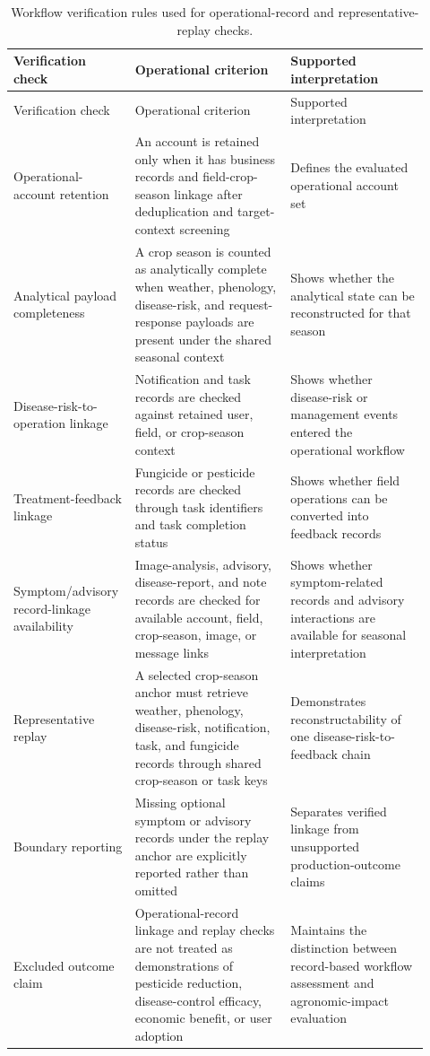 \documentclass[12pt]{article}
\begin{document}
\begingroup
\setlength{\tabcolsep}{3pt}
\renewcommand{\arraystretch}{1.12}
\begin{longtable}{@{}L{0.24\linewidth} L{0.36\linewidth} L{0.32\linewidth}@{}}
\caption{Workflow verification rules used for operational-record and representative-replay checks.}\label{tab:supp_verification_rules}\\
\toprule
Verification check & Operational criterion & Supported interpretation \\
\midrule
\endfirsthead
\toprule
Verification check & Operational criterion & Supported interpretation \\
\midrule
\endhead
Operational-account retention & An account is retained only when it has business records and field-crop-season linkage after deduplication and target-context screening & Defines the evaluated operational account set \\
Analytical payload completeness & A crop season is counted as analytically complete when weather, phenology, disease-risk, and request-response payloads are present under the shared seasonal context & Shows whether the analytical state can be reconstructed for that season \\
Disease-risk-to-operation linkage & Notification and task records are checked against retained user, field, or crop-season context & Shows whether disease-risk or management events entered the operational workflow \\
Treatment-feedback linkage & Fungicide or pesticide records are checked through task identifiers and task completion status & Shows whether field operations can be converted into feedback records \\
Symptom/advisory record-linkage availability & Image-analysis, advisory, disease-report, and note records are checked for available account, field, crop-season, image, or message links & Shows whether symptom-related records and advisory interactions are available for seasonal interpretation \\
Representative replay & A selected crop-season anchor must retrieve weather, phenology, disease-risk, notification, task, and fungicide records through shared crop-season or task keys & Demonstrates reconstructability of one disease-risk-to-feedback chain \\
Boundary reporting & Missing optional symptom or advisory records under the replay anchor are explicitly reported rather than omitted & Separates verified linkage from unsupported production-outcome claims \\
Excluded outcome claim & Operational-record linkage and replay checks are not treated as demonstrations of pesticide reduction, disease-control efficacy, economic benefit, or user adoption & Maintains the distinction between record-based workflow assessment and agronomic-impact evaluation \\
\bottomrule
\end{longtable}
\endgroup
\end{document}
